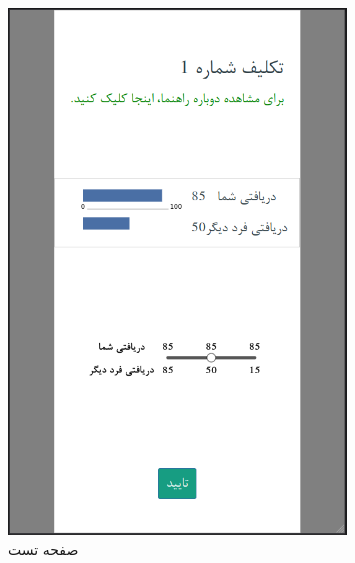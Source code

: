 \begin{figure}[htpb]
    \centering
    \includegraphics[width=0.8\textwidth]{./img/SVOPage02.png}
    \caption{صفحه تست}
    \label{fig:SVOPage02}
\end{figure}
